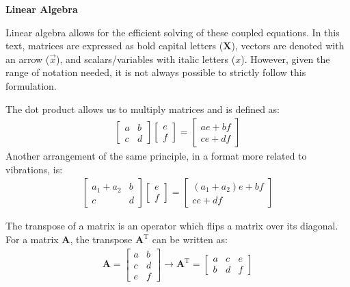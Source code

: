 \documentclass[12pt,letter]{article}
\begin{document}
	
	\begin{review}
	\textbf{Linear Algebra}
	
	Linear algebra allows for the efficient solving of these coupled equations. In this text, matrices are expressed as bold capital letters ($\textbf{X}$), vectors are denoted with an arrow ($\vec{x}$), and scalars/variables with italic letters ($x$). However, given the range of notation needed, it is not always possible to strictly follow this formulation.
	
	The dot product allows us to multiply matrices and is defined as:
	\begin{eqnarray}
	  \begin{bmatrix} a & b \\ c & d \end{bmatrix}\begin{bmatrix} e \\  f \end{bmatrix} = \begin{bmatrix} ae+bf \\ ce + df \end{bmatrix}
	\end{eqnarray}
	Another arrangement of the same principle, in a format more related to vibrations, is:
	\begin{eqnarray}
	  \begin{bmatrix} a_1+a_2 & b \\ c & d \end{bmatrix}\begin{bmatrix} e \\  f \end{bmatrix} = \begin{bmatrix} (a_1+a_2)e+bf \\ ce + df \end{bmatrix}
	\end{eqnarray}
	
	The transpose of a matrix is an operator which flips a matrix over its diagonal. For a matrix $\textbf{A}$, the transpose $\textbf{A}^\text{T}$ can be written as:
	\begin{eqnarray}
	   \textbf{A} = \begin{bmatrix} a & b \\ c & d \\ e & f\end{bmatrix} \rightarrow \textbf{A}^\text{T} = \begin{bmatrix} a & c & e \\  b & d & f \end{bmatrix}
	\end{eqnarray}
	

\end{review}
\end{document}
